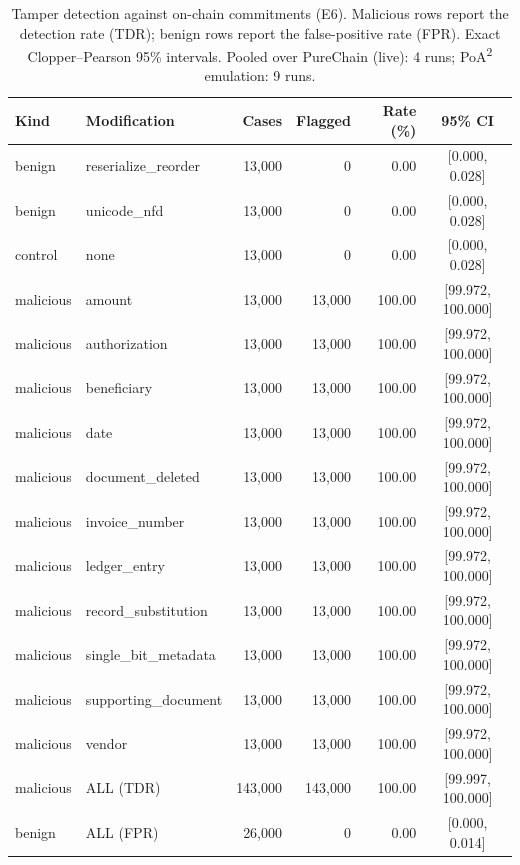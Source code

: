 \begin{table}[t]
\centering
\scriptsize
\caption{Tamper detection against on-chain commitments (E6). Malicious rows report the detection rate (TDR); benign rows report the false-positive rate (FPR). Exact Clopper--Pearson 95\% intervals. Pooled over PureChain (live): 4 runs; PoA\textsuperscript{2} emulation: 9 runs.}
\label{tab:tamper}
\begin{tabular}{llrrrc}
\toprule
Kind & Modification & Cases & Flagged & Rate (\%) & 95\% CI \\
\midrule
benign & reserialize\_reorder & 13,000 & 0 & 0.00 & [0.000, 0.028] \\
benign & unicode\_nfd & 13,000 & 0 & 0.00 & [0.000, 0.028] \\
control & none & 13,000 & 0 & 0.00 & [0.000, 0.028] \\
malicious & amount & 13,000 & 13,000 & 100.00 & [99.972, 100.000] \\
malicious & authorization & 13,000 & 13,000 & 100.00 & [99.972, 100.000] \\
malicious & beneficiary & 13,000 & 13,000 & 100.00 & [99.972, 100.000] \\
malicious & date & 13,000 & 13,000 & 100.00 & [99.972, 100.000] \\
malicious & document\_deleted & 13,000 & 13,000 & 100.00 & [99.972, 100.000] \\
malicious & invoice\_number & 13,000 & 13,000 & 100.00 & [99.972, 100.000] \\
malicious & ledger\_entry & 13,000 & 13,000 & 100.00 & [99.972, 100.000] \\
malicious & record\_substitution & 13,000 & 13,000 & 100.00 & [99.972, 100.000] \\
malicious & single\_bit\_metadata & 13,000 & 13,000 & 100.00 & [99.972, 100.000] \\
malicious & supporting\_document & 13,000 & 13,000 & 100.00 & [99.972, 100.000] \\
malicious & vendor & 13,000 & 13,000 & 100.00 & [99.972, 100.000] \\
malicious & ALL (TDR) & 143,000 & 143,000 & 100.00 & [99.997, 100.000] \\
benign & ALL (FPR) & 26,000 & 0 & 0.00 & [0.000, 0.014] \\
\bottomrule
\end{tabular}
\end{table}
